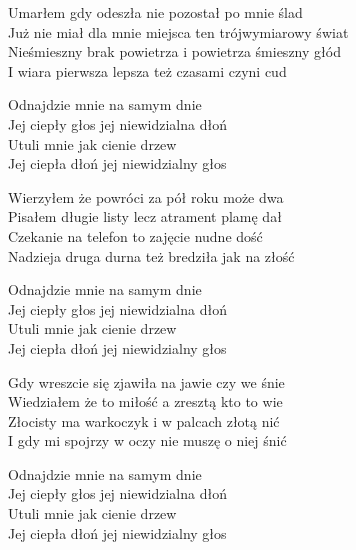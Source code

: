 \begin{text}
    Umarłem gdy odeszła nie pozostał po mnie ślad\\
    Już nie miał dla mnie miejsca ten trójwymiarowy świat\\
    Nieśmieszny brak powietrza i powietrza śmieszny głód\\
    I wiara pierwsza lepsza też czasami czyni cud

    Odnajdzie mnie na samym dnie\\
    Jej ciepły głos jej niewidzialna dłoń\\
    Utuli mnie jak cienie drzew\\
    Jej ciepła dłoń jej niewidzialny głos

    Wierzyłem że powróci za pół roku może dwa\\
    Pisałem długie listy lecz atrament plamę dał\\
    Czekanie na telefon to zajęcie nudne dość\\
    Nadzieja druga durna też bredziła jak na złość

    Odnajdzie mnie na samym dnie\\
    Jej ciepły głos jej niewidzialna dłoń\\
    Utuli mnie jak cienie drzew\\
    Jej ciepła dłoń jej niewidzialny głos

    Gdy wreszcie się zjawiła na jawie czy we śnie\\
    Wiedziałem że to miłość a zresztą kto to wie\\
    Złocisty ma warkoczyk i w palcach złotą nić\\
    I gdy mi spojrzy w oczy nie muszę o niej śnić

    Odnajdzie mnie na samym dnie\\
    Jej ciepły głos jej niewidzialna dłoń\\
    Utuli mnie jak cienie drzew\\
    Jej ciepła dłoń jej niewidzialny głos
\end{text}
\begin{chord}

\end{chord}